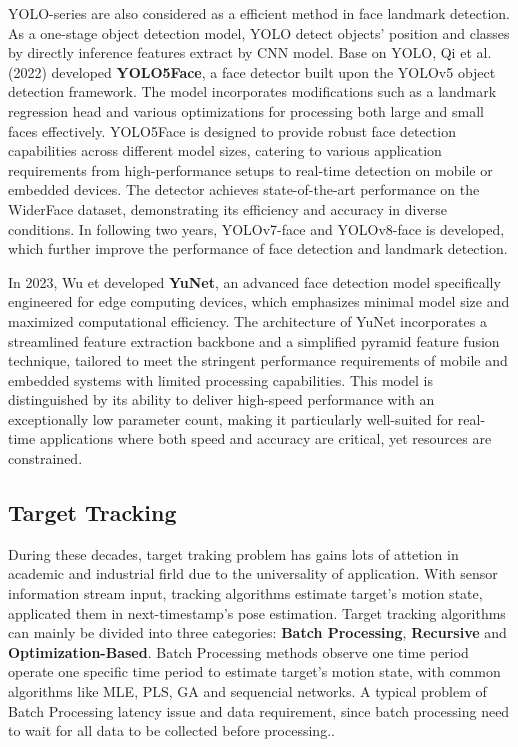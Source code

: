 YOLO-series\cite{Redmon_2016_CVPR} are also considered as a efficient method in face landmark detection. As a one-stage object detection model, YOLO detect objects' position and classes by directly inference features extract by CNN model. Base on YOLO, Qi et al. (2022) developed \textbf{YOLO5Face}\cite{Qi2022YOLO5Face}, a face detector built upon the YOLOv5 object detection framework. The model incorporates modifications such as a landmark regression head and various optimizations for processing both large and small faces effectively. YOLO5Face is designed to provide robust face detection capabilities across different model sizes, catering to various application requirements from high-performance setups to real-time detection on mobile or embedded devices. The detector achieves state-of-the-art performance on the WiderFace dataset, demonstrating its efficiency and accuracy in diverse conditions. In following two years, YOLOv7-face\cite{YOLOv7Face} and YOLOv8-face\cite{YOLOv8Face} is developed, which further improve the performance of face detection and landmark detection.


In 2023, Wu et developed \textbf{YuNet}\cite{Wu_2023}, an advanced face detection model specifically engineered for edge computing devices, which emphasizes minimal model size and maximized computational efficiency. The architecture of YuNet incorporates a streamlined feature extraction backbone and a simplified pyramid feature fusion technique, tailored to meet the stringent performance requirements of mobile and embedded systems with limited processing capabilities. This model is distinguished by its ability to deliver high-speed performance with an exceptionally low parameter count, making it particularly well-suited for real-time applications where both speed and accuracy are critical, yet resources are constrained.


\subsection{Target Tracking}
During these decades, target traking problem has gains lots of attetion in academic and industrial firld due to the universality of application. With sensor information stream input, tracking algorithms estimate target's motion state, applicated them in next-timestamp's pose estimation. Target tracking algorithms can mainly be divided into three categories: \textbf{Batch Processing}, \textbf{Recursive} and \textbf{Optimization-Based}\cite{KumarMondal2021}. Batch Processing methods observe one time period operate one specific time period to estimate target's motion state, with common algorithms like MLE, PLS, GA and sequencial networks. A typical problem of Batch Processing latency issue and data requirement, since batch processing need to wait for all data to be collected before processing.\cite{KumarMondal2021}. 

